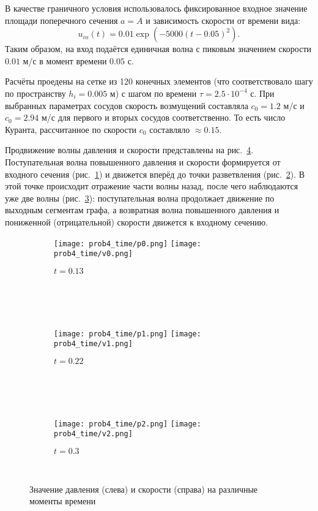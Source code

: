 В качестве граничного условия использовалось фиксированное входное значение
площади поперечного сечения $a = A$ и зависимость скорости от времени вида:
\begin{equation}
\nonumber
u_{in}(t) = 0.01\exp\left(-5000(t-0.05)^2\right).
\end{equation}
Таким образом, на вход подаётся единичная волна с пиковым
значением скорости $0.01$ м/с в момент времени $0.05$ с.

Расчёты проедены на сетке из 120 конечных элементов
(что соответствовало шагу по пространству $h_i = 0.005$ м)
с шагом по времени $\tau = 2.5\cdot10^{-4}$ с.
При выбранных параметрах сосудов скорость возмущений 
составляла $c_0=1.2$ м/с и $c_0 = 2.94$ м/с
для первого и вторых сосудов соответственно.
То есть число Куранта, рассчитанное по скорости $c_0$ составляло $\approx0.15$.


Продвижение волны давления и скорости представлены на рис.~\ref{fig:prob4_pv}.
Поступательная волна повышенного давления и скорости
формируется от входного сечения (рис.~\ref{fig:prob4_pv_a})
и движется вперёд до точки разветвления (рис.~\ref{fig:prob4_pv_b}).
В этой точке происходит отражение части волны назад, после чего
наблюдаются уже две волны (рис.~\ref{fig:prob4_pv_c}):
поступательная волна продолжает движение по выходным сегментам графа,
а возвратная волна повышенного давления и пониженной (отрицательной)
скорости движется к входному сечению.

\begin{figure}[h!]
\begin{subfigure}{1.0\linewidth}\centering
\texttt{[image: prob4\_time/p0.png]}
\texttt{[image: prob4\_time/v0.png]}
\caption{$t = 0.13$}\label{fig:prob4_pv_a}
\end{subfigure} \\
\hfill \\
\hfill \\
\begin{subfigure}{1.0\linewidth}\centering
\texttt{[image: prob4\_time/p1.png]}
\texttt{[image: prob4\_time/v1.png]}
\caption{$t = 0.22$}\label{fig:prob4_pv_b}
\end{subfigure}\\
\hfill \\
\hfill \\
\begin{subfigure}{1.0\linewidth}\centering
\texttt{[image: prob4\_time/p2.png]}
\texttt{[image: prob4\_time/v2.png]}
\caption{$t=0.3$}\label{fig:prob4_pv_c}
\end{subfigure}\\
\caption{Значение давления (слева) и скорости (справа) на различные моменты времени}\label{fig:prob4_pv}
\end{figure}

